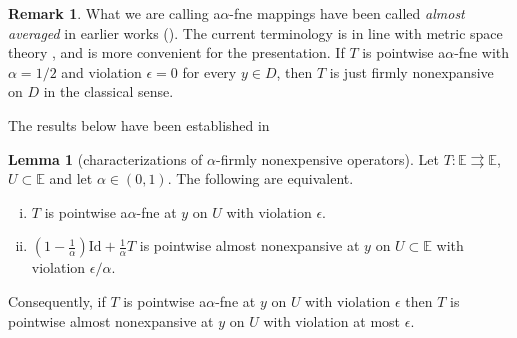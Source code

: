 \documentclass[12pt]{article}
\theoremstyle{definition}
\newtheorem{remark}{Remark}
\newtheorem{lemma}{Lemma}
\renewcommand{\equiv}{:=}
\newcommand{\Ebb}{\mathbb{E}}
\newcommand{\dist}{\mathrm{dist}}
\newcommand{\Id}{\mathrm{Id}}
\newcommand{\Fix}{\mathrm{Fix}\ }
\begin{document}
\begin{remark}\label{r:single-valued}
What we are calling a$\alpha$-fne mappings have been called {\em almost averaged} in earlier works (\cite{luke2020convergence,russell2018quantitative}).  The current terminology is in line with metric space theory \cite{berdellima2022alpha}, and is more convenient for the presentation.
If $T$ is pointwise a$\alpha$-fne with $\alpha=1/2$ and  violation $\epsilon=0$ for every $y\in D$, then $T$ is just firmly nonexpansive on $D$ in the classical sense.

\end{remark}

The results below have been established in \cite[Proposition 2.1]{russell2018quantitative}
\begin{lemma}
[characterizations of $\alpha$-firmly nonexpensive operators]
\label{lem:average char}
   Let $T: \Ebb \rightrightarrows \Ebb$, $U\subset\Ebb$ and let $\alpha\in (0,1)$.  The following are equivalent. 
\begin{enumerate}[(i)]%
   \item\label{t:average char i} $T$ is pointwise a$\alpha$-fne at $ y$ on $U$ with violation $\epsilon$.
   \item\label{t:average char ii} $(1-\frac{1}{\alpha})\Id + \frac{1}{\alpha}T$ is pointwise almost nonexpansive at $ y$ 
	on $U\subset\Ebb$ with violation $\epsilon/\alpha$. 
\end{enumerate}
Consequently, if $T$ is pointwise a$\alpha$-fne at $y$ on $U$ with violation $\epsilon$
then $T$ is pointwise almost nonexpansive at $y$ on $U$ with
violation at most $\epsilon$.
\end{lemma}
\end{document}
